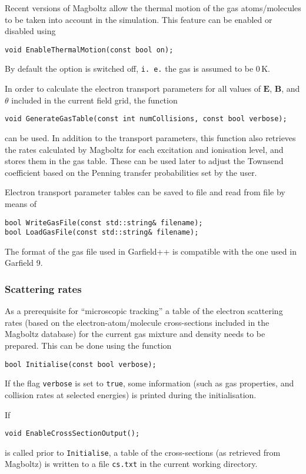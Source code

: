 Recent versions of Magboltz allow the thermal motion of the gas 
atoms/molecules to be taken into account in the simulation. 
This feature can be enabled or disabled using
\begin{lstlisting}
void EnableThermalMotion(const bool on);
\end{lstlisting} 
By default the option is switched off, \texttt{i. e.} the gas 
is assumed to be 0\,K. 

In order to calculate the electron transport parameters 
for all values of \(\mathbf{E}\), \(\mathbf{B}\), 
and \(\theta\) included in the current field grid, 
the function
\begin{lstlisting}
void GenerateGasTable(const int numCollisions, const bool verbose);
\end{lstlisting}
can be used. In addition to the transport parameters, this function also 
retrieves the rates calculated by Magboltz for each excitation and 
ionisation level, and stores them in the gas table. These can be used 
later to adjust the Townsend coefficient based on the Penning transfer 
probabilities set by the user.
 
Electron transport parameter tables can be saved to file 
and read from file by means of
\begin{lstlisting}
bool WriteGasFile(const std::string& filename);
bool LoadGasFile(const std::string& filename);
\end{lstlisting}

The format of the gas file used in Garfield++ is compatible with the 
one used in Garfield 9. 

\subsubsection{Scattering rates}

As a prerequisite for ``microscopic tracking'' a 
table of the electron scattering rates 
(based on the electron-atom/molecule cross-sections included in the 
Magboltz database) for the 
current gas mixture and density needs to be prepared. 
This can be done using the function 
\begin{lstlisting}
bool Initialise(const bool verbose);
\end{lstlisting}
If the flag \texttt{verbose} is set to \texttt{true}, 
some information (such as gas properties, and collision rates at selected 
energies) is printed during the initialisation.  

If 
\begin{lstlisting}
void EnableCrossSectionOutput();
\end{lstlisting}
is called prior to \texttt{Initialise}, a table of the cross-sections 
(as retrieved from Magboltz) is written to a file \texttt{cs.txt} 
in the current working directory. 

